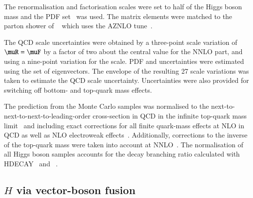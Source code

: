 The renormalisation and factorisation scales were set to half of the Higgs boson mass and the \PDFforLHC[15nnlo] PDF
set~\cite{Butterworth:2015oua} was used. The matrix elements were matched to the parton shower of \PYTHIA[8]~\cite{Sjostrand:2014zea}
which uses the AZNLO tune~\cite{STDM-2012-23}. 

The QCD scale uncertainties were obtained by a three-point scale variation of $\muR=\muF$ by a factor of two about 
the central value for the NNLO part, and using a nine-point variation for the \POWHEG scale. 
PDF and \alphas uncertainties were estimated using the \PDFforLHC[15nlo] set of eigenvectors.
The envelope of the resulting 27 scale variations was taken to estimate the QCD scale uncertainty. 
Uncertainties were also provided for switching off bottom- and top-quark mass effects.

The prediction from the Monte Carlo samples was normalised to the next-to-next-to-next-to-leading-order 
cross-section in QCD in the infinite top-quark mass 
limit~\cite{deFlorian:2016spz,Anastasiou:2016cez,Anastasiou:2015ema,Dulat:2018rbf,Aglietti:2004nj} and including exact 
corrections for all finite quark-mass effects at NLO in QCD as well as NLO electroweak 
effects~\cite{Actis:2008ug,Bonetti:2018ukf}. Additionally, corrections to the inverse of the top-quark mass were taken 
into account at NNLO~\cite{Harlander:2009mq,Harlander:2009bw,Harlander:2009my,Pak:2009dg}. 
The normalisation of all Higgs boson samples accounts for the decay branching ratio calculated with 
HDECAY~\cite{Djouadi:1997yw,Spira:1997dg,Djouadi:2006bz}
and \PROPHECY~\cite{Bredenstein:2006ha,Bredenstein:2006rh,Bredenstein:2006nk}.


\subsection{$H$ via vector-boson fusion}

